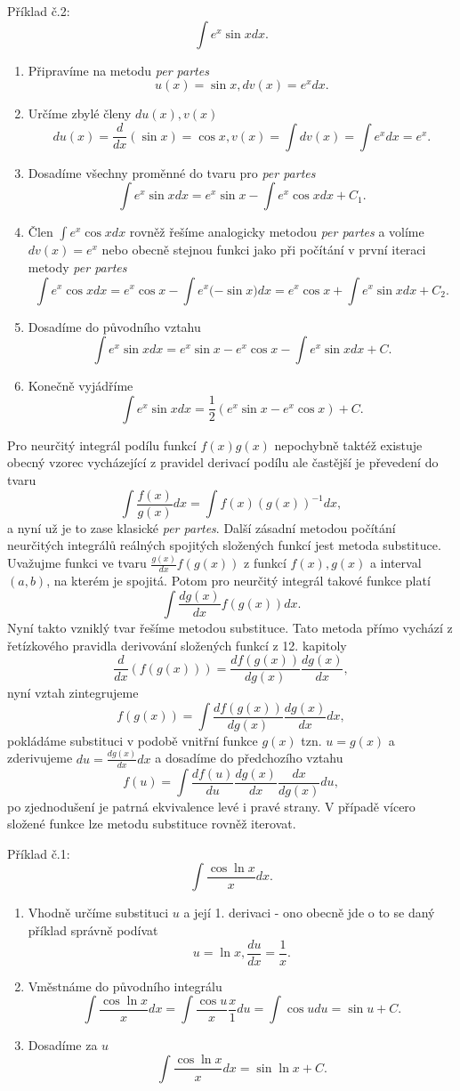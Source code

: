 Příklad č.2:
$$
\int e^x\sin{x} dx.
$$
\begin{enumerate}
    \item Připravíme na metodu \textit{per partes} 
    $$
    u(x) = \sin{x}, dv(x) = e^x dx.
    $$
    \item Určíme zbylé členy $du(x), v(x)$
    $$
    du(x) = \frac{d}{dx}(\sin{x}) = \cos{x}, v(x) = \int dv(x) = \int e^x dx = e^x.
    $$
    \item Dosadíme všechny proměnné do tvaru pro \textit{per partes}
    $$
    \int e^x\sin{x}dx = e^x\sin{x} - \int e^x\cos{x}dx + C_1.
    $$
    \item Člen $\int e^x\cos{x}dx$ rovněž řešíme analogicky metodou \textit{per partes} a volíme $dv(x) = e^x$ nebo obecně stejnou funkci jako při počítání v první iteraci metody \textit{per partes}
    $$
    \int e^x\cos{x}dx = e^x\cos{x} - \int e^x(-\sin{x)}dx = e^x\cos{x} + \int e^x\sin{x}dx + C_2.
    $$
    \item Dosadíme do původního vztahu
    $$
    \int e^x\sin{x}dx = e^x\sin{x} - e^x\cos{x} - \int e^x\sin{x}dx + C.
    $$
    \item Konečně vyjádříme
    $$
    \int e^x\sin{x}dx = \frac{1}{2}(e^x\sin{x} - e^x\cos{x}) + C.
    $$    
\end{enumerate}
Pro neurčitý integrál podílu funkcí $f(x)g(x)$ nepochybně taktéž existuje obecný vzorec vycházející z pravidel derivací podílu ale častější je převedení do tvaru
$$
\int \frac{f(x)}{g(x)}dx = \int f(x) (g(x))^{-1}dx,
$$
a nyní už je to zase klasické \textit{per partes}.
Další zásadní metodou počítání neurčitých integrálů reálných spojitých složených funkcí jest metoda substituce. Uvažujme funkci ve tvaru $\frac{g(x)}{dx}f(g(x))$ z funkcí $f(x),g(x)$ a interval $(a,b)$, na kterém je spojitá. Potom pro neurčitý integrál takové funkce platí
$$
\int\frac{dg(x)}{dx} f(g(x))dx.
$$
Nyní takto vzniklý tvar řešíme metodou substituce. Tato metoda přímo vychází z řetízkového pravidla derivování složených funkcí z 12. kapitoly
$$
\frac{d}{dx}(f(g(x)))= \frac{df(g(x))}{dg(x)}\frac{dg(x)}{dx},
$$
nyní vztah zintegrujeme
$$
f(g(x))= \int \frac{df(g(x))}{dg(x)}\frac{dg(x)}{dx} dx,
$$
pokládáme substituci v podobě vnitřní funkce $g(x)$ tzn. $u = g(x)$ a zderivujeme $du = \frac{dg(x)}{dx}dx$ a dosadíme do předchozího vztahu
$$
f(u) = \int \frac{df(u)}{du}\frac{dg(x)}{dx}\frac{dx}{dg(x)} du,
$$
po zjednodušení je patrná ekvivalence levé i pravé strany. V případě vícero složené funkce lze metodu substituce rovněž iterovat.

Příklad č.1:
$$
\int \frac{\cos{\ln{x}}}{x} dx.
$$
\begin{enumerate}
    \item Vhodně určíme substituci $u$ a její 1. derivaci  - ono obecně jde o to se daný příklad správně podívat
    $$
    u = \ln{x}, \frac{du}{dx} = \frac{1}{x}.
    $$
    \item Vměstnáme do původního integrálu
    $$
    \int \frac{\cos{\ln{x}}}{x} dx = \int \frac{\cos{u}}{x}\frac{x}{1}du = \int \cos{u}du = \sin{u} + C.
    $$
    \item Dosadíme za $u$
    $$
    \int \frac{\cos{\ln{x}}}{x} dx = \sin{\ln{x}} + C.
    $$
\end{enumerate}

